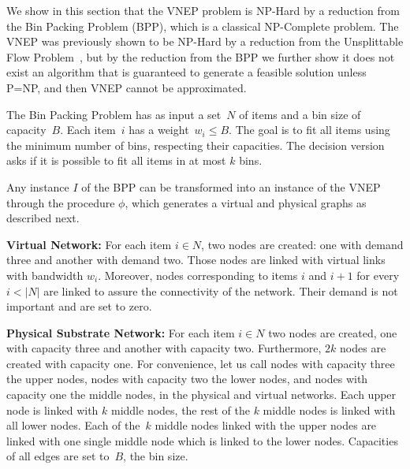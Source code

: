 We show in this section that %
the VNEP problem is NP-Hard by a reduction from the Bin Packing Problem (BPP), which is a classical NP-Complete problem.
The VNEP was previously shown to be NP-Hard by a reduction from the Unsplittable Flow Problem~\cite{Yu2008}, 
but by the reduction from the BPP we further show it does not exist an algorithm that is guaranteed to generate a feasible solution unless P=NP, and then VNEP cannot be approximated.

The Bin Packing Problem has as input a set~$N$ of items and a bin size of capacity~$B$.  Each item~$i$ has a weight~$w_{i} \leq B$. The goal is to fit all items using the minimum number of bins, respecting their capacities. The decision version asks if it is possible to fit all items in at most $k$ bins.


Any instance $I$ of the BPP can be transformed into an instance of the VNEP through the procedure $\phi$, which generates a virtual and physical graphs as described next.

\textbf{Virtual Network:} For each item $i \in N$, two nodes are created: one with demand three and another with demand two. 
Those nodes are linked with virtual links with bandwidth $w_{i}$. 
Moreover, nodes corresponding to items $i$ and $i+1$ for every $i < |N|$ are linked to assure the connectivity of the network.
Their demand is not important and are set to zero.

\textbf{Physical Substrate Network:} For each item $i \in N$ two nodes are created, one with capacity three and another with capacity two. 
Furthermore, $2k$ nodes are created with capacity one. 
For convenience, let us call nodes with capacity three the upper nodes, nodes with capacity two the lower nodes, and nodes with capacity one the middle nodes, in the physical and virtual networks.
Each upper node is linked with $k$ middle nodes, the rest of the $k$ middle nodes is linked with all lower nodes. 
Each of the~$k$ middle nodes linked with the upper nodes are linked with one single middle node which is linked to the lower nodes. 
Capacities of all edges are set to~$B$, the bin size.

